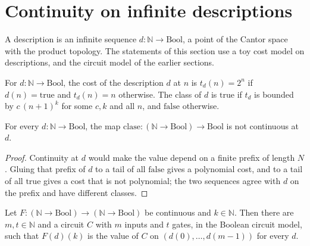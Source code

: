 \section{Continuity on infinite descriptions}
\label{sec:infinite-continuity}

A description is an infinite sequence $d : \mathbb{N} \to \mathrm{Bool}$, a point of the Cantor space with the product
topology. The statements of this section use a toy cost model on descriptions, and the circuit model of the earlier
sections.

\begin{definition}
  \label{def:infinite-t-clase}
  \leanok
  \own{}
  For $d : \mathbb{N} \to \mathrm{Bool}$, the cost of the description $d$ at $n$ is $t_d(n) = 2^n$ if $d(n) = \mathrm{true}$
  and $t_d(n) = n$ otherwise. The class of $d$ is $\mathrm{true}$ if $t_d$ is bounded by $c\,(n+1)^k$ for some $c, k$ and
  all $n$, and $\mathrm{false}$ otherwise.
\end{definition}

\begin{theorem}
  \label{thm:infinite-clase-no-continua}
  \leanok
  \own{}
  For every $d : \mathbb{N} \to \mathrm{Bool}$, the map $\mathrm{clase} : (\mathbb{N} \to \mathrm{Bool}) \to \mathrm{Bool}$
  is not continuous at $d$.
\end{theorem}

\begin{proof}
  \leanok
  Continuity at $d$ would make the value depend on a finite prefix of length $N$. Gluing that prefix of $d$ to a tail of
  all $\mathrm{false}$ gives a polynomial cost, and to a tail of all $\mathrm{true}$ gives a cost that is not polynomial; the
  two sequences agree with $d$ on the prefix and have different classes.
\end{proof}

\begin{theorem}
  \label{thm:infinite-bit-tiene-circuito}
  \leanok
  \own{}
  Let $F : (\mathbb{N} \to \mathrm{Bool}) \to (\mathbb{N} \to \mathrm{Bool})$ be continuous and $k \in \mathbb{N}$. Then there
  are $m, t \in \mathbb{N}$ and a circuit $C$ with $m$ inputs and $t$ gates, in the Boolean circuit model, such that
  $F(d)(k)$ is the value of $C$ on $(d(0), \dots, d(m-1))$ for every $d$.
\end{theorem}

